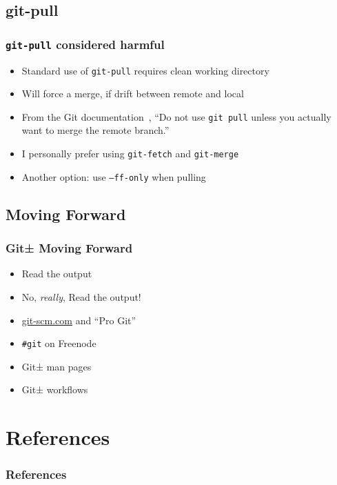 \documentclass{beamer}
\begin{document}
\subsection{git-pull}
\begin{frame}[fragile]
\frametitle{\texttt{git-pull} considered harmful}
\begin{itemize}
\item{Standard use of \texttt{git-pull} requires clean working directory}
\item{Will force a merge, if drift between remote and local}
\item{From the Git documentation~\cite{website:gitworkflows7}, ``Do not use
\texttt{git pull} unless you actually want to merge the remote branch.''}
\item{I personally prefer using \texttt{git-fetch} and \texttt{git-merge}}
\item{Another option: use \texttt{--ff-only} when pulling}
\end{itemize}

\end{frame}

\subsection{Moving Forward}
\begin{frame}
\frametitle{Git± Moving Forward}
\begin{itemize}
\item<2->{Read the output}
\item<3->{No, \textit{really}, Read the output!}
\item<4->{\url{git-scm.com} and ``Pro Git''}
\item<5->{\texttt{\#{}git} on Freenode}
\item<6->{Git± man pages~\cite{website:git_man_pages}
~\cite{website:understand_git_man_pages}}
\item<7->{Git± workflows~\cite{website:gitworkflows7}}
\end{itemize}
\end{frame}

\section*{References}
\begin{frame}[allowframebreaks]
\frametitle{References}
\nocite{*}
\renewcommand{\refname}{}


\end{frame}

\end{document}
